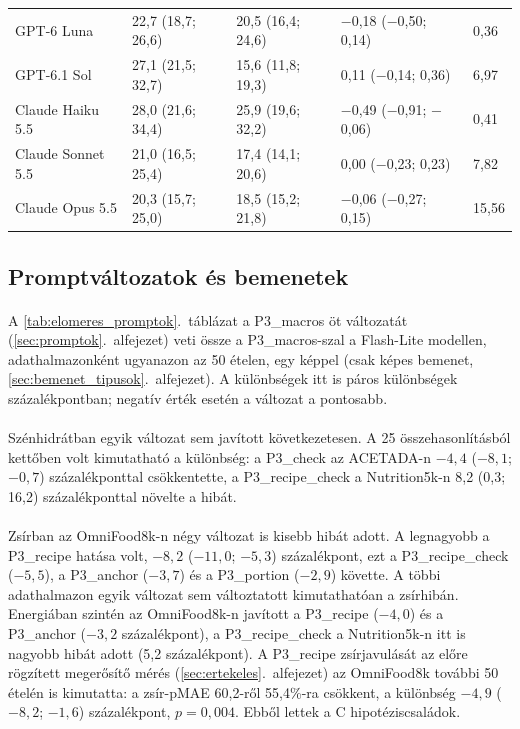 \begin{table}[p]
{\begin{tabular}{lllll}
GPT-6 Luna & 22,7 (18,7; 26,6) & 20,5 (16,4; 24,6) & $-$0,18 ($-$0,50; 0,14) & 0,36 \\
GPT-6.1 Sol & 27,1 (21,5; 32,7) & 15,6 (11,8; 19,3) & 0,11 ($-$0,14; 0,36) & 6,97 \\
Claude Haiku 5.5 & 28,0 (21,6; 34,4) & 25,9 (19,6; 32,2) & $-$0,49 ($-$0,91; $-$0,06) & 0,41 \\
Claude Sonnet 5.5 & 21,0 (16,5; 25,4) & 17,4 (14,1; 20,6) & 0,00 ($-$0,23; 0,23) & 7,82 \\
Claude Opus 5.5 & 20,3 (15,7; 25,0) & 18,5 (15,2; 21,8) & $-$0,06 ($-$0,27; 0,15) & 15,56 \\
\hline
\end{tabular}}
\end{table}

\subsection{Promptváltozatok és bemenetek}
\paragraph{}A \ref{tab:elomeres_promptok}.~táblázat a P3\_macros öt változatát 
(\ref{sec:promptok}.~alfejezet) veti össze a P3\_macros-szal a Flash-Lite modellen, adathalmazonként 
ugyanazon az 50 ételen, egy képpel (csak képes bemenet, \ref{sec:bemenet_tipusok}.~alfejezet). 
A különbségek itt is páros különbségek százalékpontban; negatív érték esetén a változat a pontosabb.

\paragraph{}Szénhidrátban egyik változat sem javított következetesen. A 25 összehasonlításból 
kettőben volt kimutatható a különbség: a P3\_check az ACETADA-n $-4{,}4$ ($-8{,}1$; $-0{,}7$) 
százalékponttal csökkentette, a P3\_recipe\_check a Nutrition5k-n 8,2 (0,3; 16,2) százalékponttal 
növelte a hibát.

\paragraph{}Zsírban az OmniFood8k-n négy változat is kisebb hibát adott. A legnagyobb a P3\_recipe 
hatása volt, $-8{,}2$ ($-11{,}0$; $-5{,}3$) százalékpont, ezt a P3\_recipe\_check ($-5{,}5$), a 
P3\_anchor ($-3{,}7$) és a P3\_portion ($-2{,}9$) követte. A többi adathalmazon egyik változat sem 
változtatott kimutathatóan a zsírhibán. Energiában szintén az OmniFood8k-n javított a P3\_recipe 
($-4{,}0$) és a P3\_anchor ($-3{,}2$ százalékpont), a P3\_recipe\_check a Nutrition5k-n itt is 
nagyobb hibát adott (5,2 százalékpont). A P3\_recipe zsírjavulását az előre rögzített megerősítő 
mérés (\ref{sec:ertekeles}.~alfejezet) az OmniFood8k további 50 ételén is kimutatta: a zsír-pMAE 
60,2-ről 55,4\%-ra csökkent, a különbség $-4{,}9$ ($-8{,}2$; $-1{,}6$) százalékpont, $p = 0{,}004$. 
Ebből lettek a C hipotéziscsaládok.

